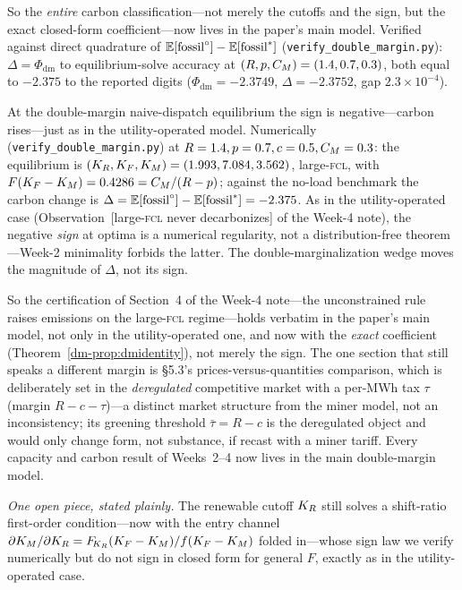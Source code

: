So the \emph{entire} carbon classification---not merely the cutoffs and the sign, but the exact
closed-form coefficient---now lives in the paper's main model. Verified against direct
quadrature of $\mathbb{E}[\mathrm{fossil}^{\circ}]-\mathbb{E}[\mathrm{fossil}^{*}]$ (\texttt{verify\_double\_margin.py}):
$\Delta=\Phi_{\mathrm{dm}}$ to equilibrium-solve accuracy at
$(R,p,C_M)=(1.4,0.7,0.3)$, both equal to $-2.375$ to the reported digits ($\Phi_{\mathrm{dm}}=-2.3749$, $\Delta=-2.3752$, gap $2.3\times10^{-4}$).
\begin{observation}\label{dm-prop:dmcarbon}
At the double-margin naive-dispatch equilibrium the sign is negative---carbon rises---just as
in the utility-operated model. Numerically (\texttt{verify\_double\_margin.py}) at
$R=1.4,p=0.7,c=0.5,C_M=0.3$: the equilibrium is $(K_R,K_F,K_M)=(1.993,7.084,3.562)$,
large-\textsc{fcl}, with $F(K_F-K_M)=0.4286=C_M/(R-p)$; against the no-load benchmark the
carbon change is $\Delta=\mathbb{E}[\mathrm{fossil}^{\circ}]-\mathbb{E}[\mathrm{fossil}^{*}]=-2.375$. As in the utility-operated
case (Observation~[large-\textsc{fcl} never decarbonizes] of the Week-4 note), the negative
\emph{sign} at optima is a numerical regularity, not a distribution-free theorem---Week-2
minimality forbids the latter. The double-marginalization wedge moves the magnitude of
$\Delta$, not its sign.
\end{observation}
So the certification of Section~4 of the Week-4 note---the unconstrained rule raises emissions
on the large-\textsc{fcl} regime---holds verbatim in the paper's main model, not only in the
utility-operated one, and now with the \emph{exact} coefficient
(Theorem~\ref{dm-prop:dmidentity}), not merely the sign. The one section that still speaks a
different margin is \S5.3's prices-versus-quantities comparison, which is deliberately set in
the \emph{deregulated} competitive market with a per-MWh tax $\tau$ (margin $R-c-\tau$)---a
distinct market structure from the miner model, not an inconsistency; its greening threshold
$\bar\tau=R-c$ is the deregulated object and would only change form, not substance, if recast
with a miner tariff. Every capacity and carbon result of Weeks~2--4 now lives in the main
double-margin model.

\emph{One open piece, stated plainly.} The renewable cutoff $K_R$ still solves a shift-ratio
first-order condition---now with the entry channel $\partial K_M/\partial K_R=F_{\!K_R}(K_F-K_M)/f(K_F-K_M)$
folded in---whose sign law we verify numerically but do not sign in closed form for general
$F$, exactly as in the utility-operated case.
